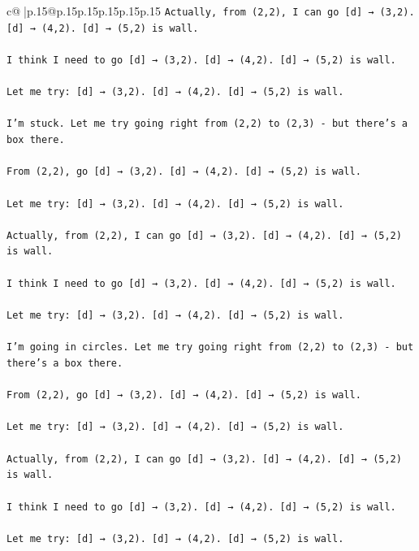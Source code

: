 \documentclass{article}
\begin{document}
{\begin{supertabular}{c@{$\;$}|p{.15\linewidth}@{}p{.15\linewidth}p{.15\linewidth}p{.15\linewidth}p{.15\linewidth}p{.15\linewidth}}
{{{\texttt{Actually, from (2,2), I can go {[}d{]} → (3,2). {[}d{]} → (4,2). {[}d{]} → (5,2) is wall.} \\
\\ 
\texttt{I think I need to go {[}d{]} → (3,2). {[}d{]} → (4,2). {[}d{]} → (5,2) is wall.} \\
\\ 
\texttt{Let me try: {[}d{]} → (3,2). {[}d{]} → (4,2). {[}d{]} → (5,2) is wall.} \\
\\ 
\texttt{I'm stuck. Let me try going right from (2,2) to (2,3) {-} but there's a box there.} \\
\\ 
\texttt{From (2,2), go {[}d{]} → (3,2). {[}d{]} → (4,2). {[}d{]} → (5,2) is wall.} \\
\\ 
\texttt{Let me try: {[}d{]} → (3,2). {[}d{]} → (4,2). {[}d{]} → (5,2) is wall.} \\
\\ 
\texttt{Actually, from (2,2), I can go {[}d{]} → (3,2). {[}d{]} → (4,2). {[}d{]} → (5,2) is wall.} \\
\\ 
\texttt{I think I need to go {[}d{]} → (3,2). {[}d{]} → (4,2). {[}d{]} → (5,2) is wall.} \\
\\ 
\texttt{Let me try: {[}d{]} → (3,2). {[}d{]} → (4,2). {[}d{]} → (5,2) is wall.} \\
\\ 
\texttt{I'm going in circles. Let me try going right from (2,2) to (2,3) {-} but there's a box there.} \\
\\ 
\texttt{From (2,2), go {[}d{]} → (3,2). {[}d{]} → (4,2). {[}d{]} → (5,2) is wall.} \\
\\ 
\texttt{Let me try: {[}d{]} → (3,2). {[}d{]} → (4,2). {[}d{]} → (5,2) is wall.} \\
\\ 
\texttt{Actually, from (2,2), I can go {[}d{]} → (3,2). {[}d{]} → (4,2). {[}d{]} → (5,2) is wall.} \\
\\ 
\texttt{I think I need to go {[}d{]} → (3,2). {[}d{]} → (4,2). {[}d{]} → (5,2) is wall.} \\
\\ 
\texttt{Let me try: {[}d{]} → (3,2). {[}d{]} → (4,2). {[}d{]} → (5,2) is wall.} \\
\\ 
}}}
\end{supertabular}}
\end{document}
